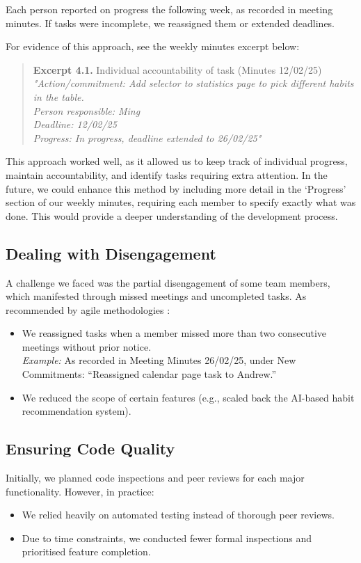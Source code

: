 Each person reported on progress the following week, as recorded in meeting minutes. If tasks were incomplete, we reassigned them or extended deadlines.

For evidence of this approach, see the weekly minutes excerpt below:

\begin{quote}
\textbf{Excerpt 4.1.} Individual accountability of task (Minutes 12/02/25)\\
\textit{"Action/commitment: Add selector to statistics page to pick different habits in the table.\\
Person responsible: Ming\\
Deadline: 12/02/25\\
Progress: In progress, deadline extended to 26/02/25"}
\end{quote}

This approach worked well, as it allowed us to keep track of individual progress, maintain accountability, and identify tasks requiring extra attention. In the future, we could enhance this method by including more detail in the ‘Progress’ section of our weekly minutes, requiring each member to specify exactly what was done. This would provide a deeper understanding of the development process.

\subsection{Dealing with Disengagement}
A challenge we faced was the partial disengagement of some team members, which manifested through missed meetings and uncompleted tasks. As recommended by agile methodologies \cite{schwaber2020scrum}:
\begin{itemize}
    \item We reassigned tasks when a member missed more than two consecutive meetings without prior notice.\\
    \textit{Example:} As recorded in Meeting Minutes 26/02/25, under New Commitments: “Reassigned calendar page task to Andrew.”
    \item We reduced the scope of certain features (e.g., scaled back the AI-based habit recommendation system).
\end{itemize}

\subsection{Ensuring Code Quality}
Initially, we planned code inspections and peer reviews for each major functionality. However, in practice:
\begin{itemize}
    \item We relied heavily on automated testing instead of thorough peer reviews.
    \item Due to time constraints, we conducted fewer formal inspections and prioritised feature completion.
\end{itemize}

